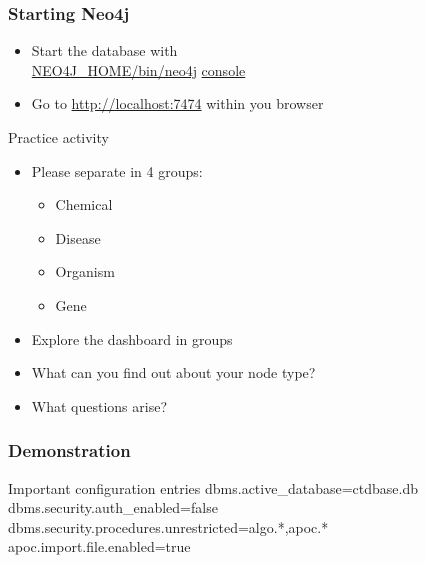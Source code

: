 \documentclass[12pt]{beamer}
\begin{document}
    \begin{frame}
        \frametitle{Starting Neo4j}
        \begin{itemize}
            \item Start the database with\\
            \textcolor{white}{\url{NEO4J_HOME/bin/neo4j} \url{console}}
            \pause
            \item Go to \textcolor{white}{\url{http://localhost:7474}} within you browser
        \end{itemize}
    \end{frame}
    
    \begin{frame}{Practice activity}
        \begin{itemize}
            \item Please separate in 4 groups:
            \begin{itemize}
                \item Chemical
                \item Disease
                \item Organism
                \item Gene
            \end{itemize}
            \pause
            \item Explore the dashboard in groups
            \item What can you find out about your node type?
            \item What questions arise?
        \end{itemize}
        
    \end{frame}
    
    \begin{frame}
        \frametitle{Demonstration}
        \begin{block}{Important configuration entries}
            dbms.active\_database=ctdbase.db\\
            dbms.security.auth\_enabled=false\\
            dbms.security.procedures.unrestricted=algo.*,apoc.*\\
            apoc.import.file.enabled=true
        \end{block}
    \end{frame}
    
\end{document}
